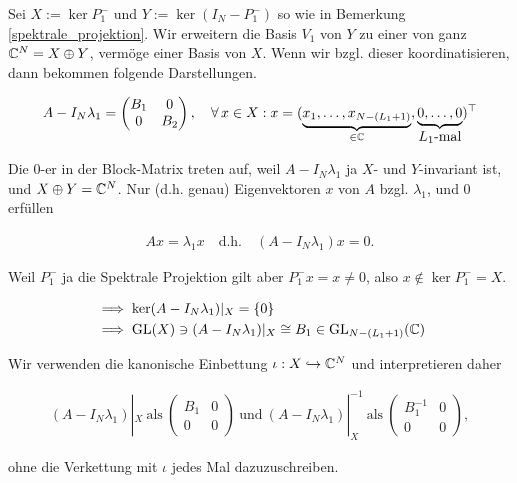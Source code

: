 \begin{remark} \label{semi_inverse}

    Sei $X := \ker P_1^-$ und $Y := \ker(I_N - P_1^-)$ so wie in Bemerkung \ref{spektrale_projektion}.
    Wir erweitern die Basis $V_1$ von $Y$ zu einer von ganz $\mathbb{C}^N = X \oplus Y$, vermöge einer Basis von $X$.
    Wenn wir bzgl. dieser koordinatisieren, dann bekommen folgende Darstellungen.

    \begin{align*}
        A - I_N \lambda_1
        =
        \begin{pmatrix}
            B_1 & 0 \\
            0   & B_2
        \end{pmatrix},
        \quad
        \forall \, x \in X:
            x
            =
            (
                \underbrace
                {
                    x_1, \dots, x_{N - (L_1 + 1)}
                }_{
                    \in \mathbb{C}
                },
                \underbrace
                {
                    0, \dots, 0
                }_{
                    \displaystyle
                    \text{$L_1$-mal}
                }
            )^\top
    \end{align*}

    Die $0$-er in der Block-Matrix treten auf, weil $A - I_N \lambda_1$ ja $X$- und $Y$-invariant ist, und $X \oplus Y = \mathbb{C}^N$.
    Nur (d.h. genau) Eigenvektoren $x$ von $A$ bzgl. $\lambda_1$, und $0$ erfüllen

    \begin{align*}
        A x = \lambda_1 x
        \quad
        \text{d.h.}
        \quad
        (A - I_N \lambda_1) x = 0.
    \end{align*}

    Weil $P_1^-$ ja die Spektrale Projektion gilt aber $P_1^- x = x \neq 0$, also $x \not \in \ker P_1^- = X$.

    \begin{align*}
        & \implies
        \ker(A - I_N \lambda_1) |_X = {\left \{ 0 \right \}} \\
        & \implies
        \operatorname{GL}(X) \ni (A - I_N \lambda_1) |_X \cong B_1 \in \operatorname{GL}_{N - (L_1 + 1)}(\mathbb{C})
    \end{align*}

    Wir verwenden die kanonische Einbettung $\iota: X \hookrightarrow \mathbb{C}^N$ und interpretieren daher

    \begin{align*}
        (A - I_N \lambda_1) |_X
        ~\text{als}~
        \begin{pmatrix}
            B_1 & 0 \\ 0 & 0
        \end{pmatrix}
        ~\text{und}~
        (A - I_N \lambda_1) |_X^{-1}
        ~\text{als}~
        \begin{pmatrix}
            B_1^{-1} & 0 \\ 0 & 0
        \end{pmatrix},
    \end{align*}

    ohne die Verkettung mit $\iota$ jedes Mal dazuzuschreiben.

\end{remark}